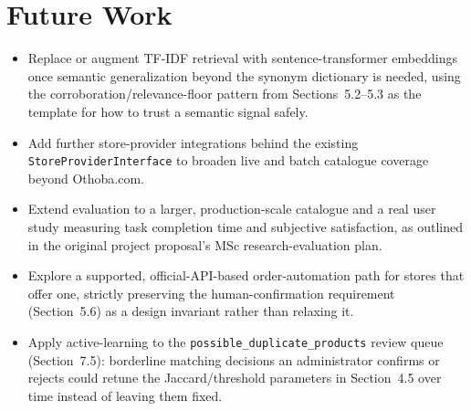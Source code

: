 \documentclass[12pt,a4paper]{report}
\begin{document}
\section{Future Work}
\begin{itemize}
\item Replace or augment TF-IDF retrieval with sentence-transformer embeddings once semantic
generalization beyond the synonym dictionary is needed, using the corroboration/relevance-floor pattern
from Sections~5.2--5.3 as the template for how to trust a semantic signal safely.
\item Add further store-provider integrations behind the existing \texttt{StoreProviderInterface} to
broaden live and batch catalogue coverage beyond Othoba.com.
\item Extend evaluation to a larger, production-scale catalogue and a real user study measuring task
completion time and subjective satisfaction, as outlined in the original project proposal's MSc
research-evaluation plan.
\item Explore a supported, official-API-based order-automation path for stores that offer one, strictly
preserving the human-confirmation requirement (Section~5.6) as a design invariant rather than relaxing it.
\item Apply active-learning to the \texttt{possible\_duplicate\_products} review queue (Section~7.5):
borderline matching decisions an administrator confirms or rejects could retune the Jaccard/threshold
parameters in Section~4.5 over time instead of leaving them fixed.
\end{itemize}
\end{document}
